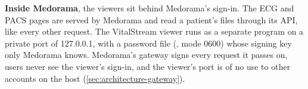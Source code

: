 \textbf{Inside Medorama}, the viewers sit behind Medorama's sign-in. The ECG and PACS pages are
served by Medorama and read a patient's files through its API, like every other request. The
VitalStream viewer runs as a separate program on a private port of 127.0.0.1, with a password
file (, mode 0600) whose signing key only Medorama knows.
Medorama's gateway signs every request it passes on, users never see the viewer's sign-in, and
the viewer's port is of no use to other accounts on the host (\cref{sec:architecture-gateway}).
